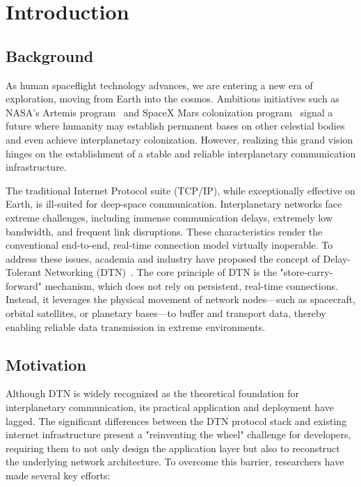 \chapter{Introduction}

\section{Background}
As human spaceflight technology advances, we are entering a new era of exploration, moving from Earth into the cosmos. Ambitious initiatives such as NASA's Artemis program~\cite{NASA:2024acr} and SpaceX Mars colonization program~\cite{Musk:2017} signal a future where humanity may establish permanent bases on other celestial bodies and even achieve interplanetary colonization. However, realizing this grand vision hinges on the establishment of a stable and reliable interplanetary communication infrastructure.

The traditional Internet Protocol suite (TCP/IP), while exceptionally effective on Earth, is ill-suited for deep-space communication. Interplanetary networks face extreme challenges, including immense communication delays, extremely low bandwidth, and frequent link disruptions. These characteristics render the conventional end-to-end, real-time connection model virtually inoperable. To address these issues, academia and industry have proposed the concept of Delay-Tolerant Networking (DTN)~\cite{DTN}\cite{rfc4838}. The core principle of DTN is the "store-carry-forward" mechanism, which does not rely on persistent, real-time connections. Instead, it leverages the physical movement of network nodes—such as spacecraft, orbital satellites, or planetary bases—to buffer and transport data, thereby enabling reliable data transmission in extreme environments.

\section{Motivation}
Although DTN is widely recognized as the theoretical foundation for interplanetary communication, its practical application and deployment have lagged. The significant differences between the DTN protocol stack and existing internet infrastructure present a "reinventing the wheel" challenge for developers, requiring them to not only design the application layer but also to reconstruct the underlying network architecture. To overcome this barrier, researchers have made several key efforts:

